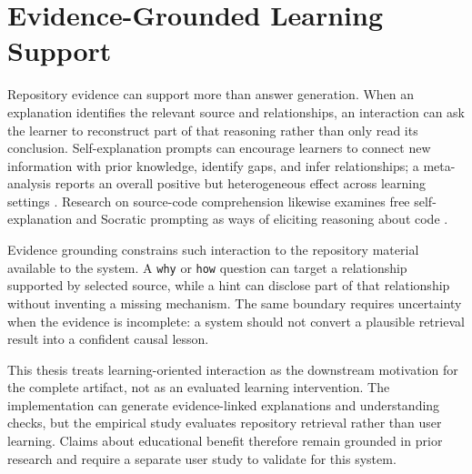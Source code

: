 \section{Evidence-Grounded Learning Support}\label{sec:evidence-grounded-learning-support}

Repository evidence can support more than answer generation. When an explanation identifies the relevant source and relationships, an interaction can ask the learner to reconstruct part of that reasoning rather than only read its conclusion. Self-explanation prompts can encourage learners to connect new information with prior knowledge, identify gaps, and infer relationships; a meta-analysis reports an overall positive but heterogeneous effect across learning settings \textcite{Bisra2018SelfExplanation}. Research on source-code comprehension likewise examines free self-explanation and Socratic prompting as ways of eliciting reasoning about code \textcite{Tamang2021Socratic}.

Evidence grounding constrains such interaction to the repository material available to the system. A \texttt{why} or \texttt{how} question can target a relationship supported by selected source, while a hint can disclose part of that relationship without inventing a missing mechanism. The same boundary requires uncertainty when the evidence is incomplete: a system should not convert a plausible retrieval result into a confident causal lesson.

This thesis treats learning-oriented interaction as the downstream motivation for the complete artifact, not as an evaluated learning intervention. The implementation can generate evidence-linked explanations and understanding checks, but the empirical study evaluates repository retrieval rather than user learning. Claims about educational benefit therefore remain grounded in prior research and require a separate user study to validate for this system.
